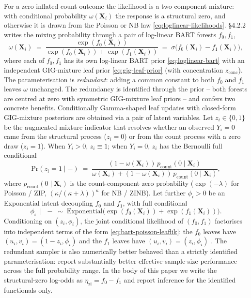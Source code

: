 \documentclass[11pt]{article}
\theoremstyle{plain}
\theoremstyle{definition}
\theoremstyle{remark}
\newcommand{\Exp}{\mathrm{Exponential}}
\newcommand{\X}{\mathbf{X}}
\renewcommand{\Pr}{\mathrm{Pr}}
\newcommand{\etazi}{\eta_{\mathrm{zi}}}
\newcommand{\fzeroSym}{f_{0}}
\newcommand{\foneSym}{f_{1}}
\newcommand{\zconc}{z_{\mathrm{conc}}}
\newcommand{\zilat}{z_{i}}
\newcommand{\philat}{\phi_{i}}
\begin{document}
For a zero-inflated count outcome the likelihood is a two-component
mixture: with conditional probability $\omega(\X_i)$ the response is
a structural zero, and otherwise it is drawn from the Poisson or NB
law \eqref{eq:loglinear-likelihoods}. \citet{murray2021loglinear}
\S4.2.2 writes the mixing probability through a pair of log-linear
BART forests $\fzeroSym, \foneSym$,
\begin{equation}
  \omega(\X_i)
  \;=\;
  \frac{\exp(\fzeroSym(\X_i))}{\exp(\fzeroSym(\X_i)) + \exp(\foneSym(\X_i))}
  \;=\;
  \sigma\!\bigl(\fzeroSym(\X_i) - \foneSym(\X_i)\bigr),
  \label{eq:omega-redundant}
\end{equation}
where each of $\fzeroSym, \foneSym$ has its own log-linear BART prior
\eqref{eq:loglinear-bart} with an independent GIG-mixture leaf prior
\eqref{eq:gig-leaf-prior} (with concentration $\zconc$). The
parameterisation is \emph{redundant}: adding a common constant to
both $\fzeroSym$ and $\foneSym$ leaves $\omega$ unchanged. The
redundancy is identified through the prior -- both forests are
centred at zero with symmetric GIG-mixture leaf priors -- and confers
two concrete benefits. Conditionally Gamma-shaped leaf updates with
closed-form GIG-mixture posteriors are obtained via a pair of latent
variables. Let $\zilat \in \{0, 1\}$ be the augmented mixture
indicator that resolves whether an observed $Y_i = 0$ came from the
structural process ($\zilat = 0$) or from the count process with a
zero draw ($\zilat = 1$). When $Y_i > 0$, $\zilat \equiv 1$; when
$Y_i = 0$, $\zilat$ has the Bernoulli full conditional
\begin{equation}
  \Pr(\zilat = 1 \mid -)
  \;=\;
  \frac{(1 - \omega(\X_i))\, p_{\mathrm{count}}(0 \mid \X_i)}
       {\omega(\X_i) + (1 - \omega(\X_i))\, p_{\mathrm{count}}(0 \mid \X_i)},
  \label{eq:zilat-fc}
\end{equation}
where $p_{\mathrm{count}}(0 \mid \X_i)$ is the count-component zero
probability ($\exp(-\lambda)$ for Poisson / ZIP,
$(\kappa / (\kappa + \lambda))^\kappa$ for NB / ZINB). Let further
$\philat > 0$ be an Exponential latent decoupling $\fzeroSym$ and
$\foneSym$, with full conditional
\begin{equation}
  \philat \;\mid\; - \;\sim\;
  \Exp\!\bigl(\exp(\fzeroSym(\X_i)) + \exp(\foneSym(\X_i))\bigr).
  \label{eq:phi-fc}
\end{equation}
Conditioning on $(\zilat, \philat)$, the joint conditional likelihood
of $(\fzeroSym, \foneSym)$ factorises into independent terms of the
form \eqref{eq:bart-poisson-leaflik}: the $\fzeroSym$ leaves have
$(u_i, v_i) = (1 - \zilat, \philat)$ and the $\foneSym$ leaves have
$(u_i, v_i) = (\zilat, \philat)$ \citep[\S A.5, Proposition
1]{murray2021loglinear}. The redundant sampler is also numerically
better behaved than a strictly identified parameterisation:
\citet[Supplement \S A]{murray2021loglinear} report substantially
better effective-sample-size performance across the full
probability range. In the body of this paper we write the
structural-zero log-odds as $\etazi = \fzeroSym - \foneSym$ and
report inference for the identified functionals only.
\end{document}
